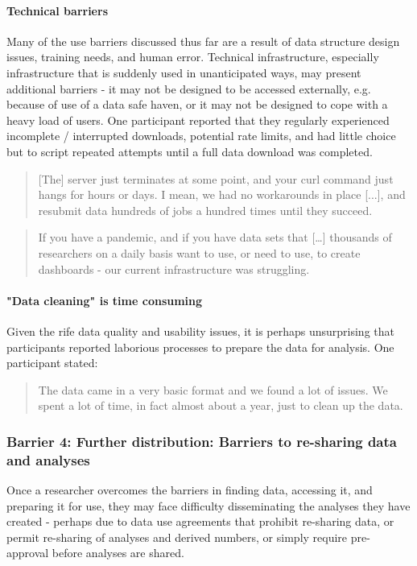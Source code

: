 \documentclass{CUP-JNL-DAP}%
\begin{document}
\paragraph{Technical barriers} 
Many of the use barriers discussed thus far are a result of data structure design issues, training needs, and human error. Technical infrastructure, especially infrastructure that is suddenly used in unanticipated ways, may present additional barriers - it may not be designed to be accessed externally, e.g. because of use of a data safe haven, or it may not be designed to cope with a heavy load of users. One participant reported that they regularly experienced incomplete / interrupted downloads, potential rate limits, and had little choice but to script repeated attempts until a full data download was completed. 

\blockquote{[The] server just terminates at some point, and your curl command just hangs for hours or days. I mean, we had no workarounds in place [...], and resubmit data hundreds of jobs a hundred times until they succeed.}

\blockquote{If you have a pandemic, and if you have data sets that […] thousands of researchers on a daily basis want to use, or need to use, to create dashboards - our current infrastructure was struggling.}

\paragraph{"Data cleaning" is time consuming} 

Given the rife data quality and usability issues, it is perhaps unsurprising that participants reported laborious processes to prepare the data for analysis. One participant stated: 

\blockquote{The data came in a very basic format and we found a lot of issues. We spent a lot of time, in fact almost about a year, just to clean up the data.}

\subsubsection{Barrier 4: Further distribution: Barriers to re-sharing data and analyses}

Once a researcher overcomes the barriers in finding data, accessing it, and preparing it for use, they may face difficulty disseminating the analyses they have created - perhaps due to data use agreements that prohibit re-sharing data, or permit re-sharing of analyses and derived numbers, or simply  require pre-approval before analyses are shared. 
\end{document}

